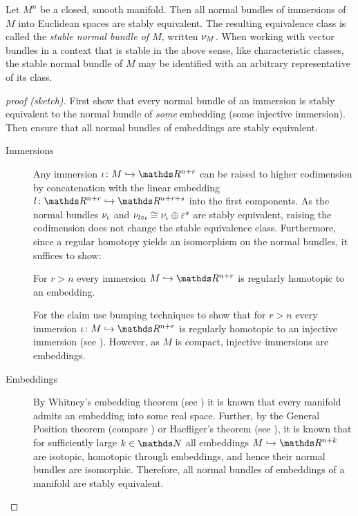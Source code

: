 \begin{LemDef}
  Let $M^n$ be a closed, smooth manifold.
  Then all normal bundles of immersions of $M$ into
  Euclidean spaces are stably equivalent.
  The resulting equivalence class is called the
  \emph{stable normal bundle of $M$}, written $\nu_{M}$.
  When working with vector bundles in a context that is stable in the
  above sense, like \forexample characteristic classes, the stable
  normal bundle of $M$ may be identified with an arbitrary
  representative of its class.
  \begin{proof}[proof (sketch)]
    First show that every normal bundle of an immersion is stably
    equivalent to the 
    normal bundle of \emph{some} embedding (\idest some injective
    immersion). Then ensure that all normal bundles of embeddings are
    stably equivalent.
    \begin{description}
    \item[Immersions]
      Any immersion $\imm\colon M\immto\R^{n+r}$ can be raised to
      higher codimension by concatenation with the linear embedding
      $l\colon\R^{n+r}\immto\R^{n+r+s}$ into the first components.
      As the normal bundles $\nu_{{\iota}}$ and
      $\nu_{l\circ{\iota}}\cong\nu_{{\iota}}\oplus\varepsilon^s$ are stably
      equivalent, raising the codimension does not change the stable
      equivalence class.
      Furthermore, since a regular homotopy yields an
      isomorphism on the normal bundles, it suffices to show:
      \begin{claim}
        For $r>n$ every immersion $M\immto\R^{n+r}$ is regularly
        homotopic to an embedding.
      \end{claim}
      For the claim use bumping techniques
      to show that for $r>n$ every
      immersion $\imm\colon M\immto\R^{n+r}$ is regularly homotopic to
      an injective immersion
      (see \forexample \cite[Chap.~II, Lemma~2.5]{adachi}).
      However, as $M$ is compact, injective immersions
      are embeddings.
    \item[Embeddings]
      By Whitney's embedding theorem
      (see \forexample \cite[Chap.~II.2]{adachi})
      it is known that every manifold admits an embedding into some
      real space.
      Further, by \forexample the General Position theorem
      (compare \cite[Chap.~2]{embeddingsummary})
      or Haefliger's theorem (see \forexample \cite[Chap.~II.1]{adachi}),
      it is known that for sufficiently large $k\in\Nat$ all embeddings
      $M\immto\R^{n+k}$ are isotopic, \idest homotopic through embeddings,
      and hence their normal bundles are isomorphic.
      Therefore, all normal bundles of embeddings of a manifold are
      stably equivalent.
      \qedhere
    \end{description}
  \end{proof}
\end{LemDef}

